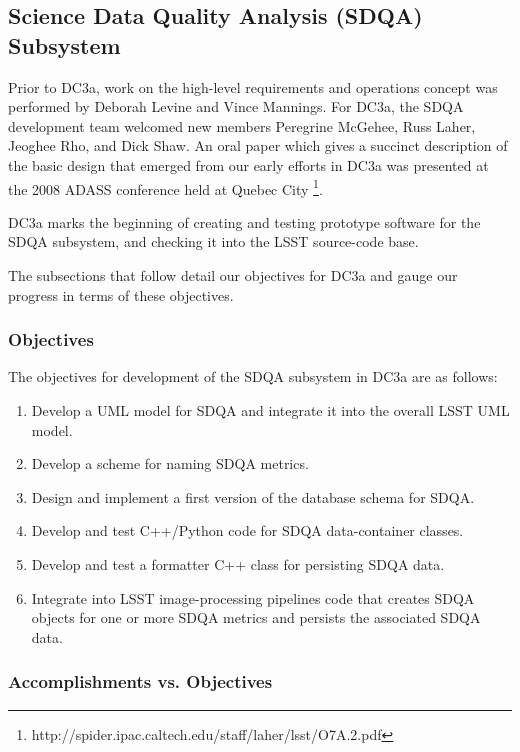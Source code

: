 
\subsection{Science Data Quality Analysis (SDQA) Subsystem}

Prior to DC3a, work on the high-level requirements and operations concept was performed 
by Deborah Levine and Vince Mannings.  For DC3a, the SDQA development team welcomed new
members Peregrine McGehee, Russ Laher, Jeoghee Rho, and Dick Shaw.  An oral paper which
gives a succinct description of the basic design that emerged from our early efforts in 
DC3a was presented at the 2008 ADASS conference held at Quebec City \citep{laher08}\footnote{http://spider.ipac.caltech.edu/staff/laher/lsst/O7A.2.pdf}.

DC3a marks the beginning of creating and testing prototype software for the SDQA subsystem, and checking it into the LSST source-code base.

The subsections that follow detail our objectives for DC3a and gauge our progress in
terms of these objectives.


\subsubsection{Objectives}

   The objectives for development of the SDQA subsystem in DC3a are as follows:

\begin{enumerate} 
\item{Develop a UML model for SDQA and integrate it into the overall LSST UML model.} 
\item{Develop a scheme for naming SDQA metrics. }
\item{Design and implement a first version of the database schema for SDQA.}
\item{Develop and test C++/Python code for SDQA data-container classes.}
\item{Develop and test a formatter C++ class for persisting SDQA data.}
\item{Integrate into LSST image-processing pipelines code that creates SDQA objects
for one or more SDQA metrics and persists the associated SDQA data.}
\end{enumerate}

\subsubsection{Accomplishments vs. Objectives}

